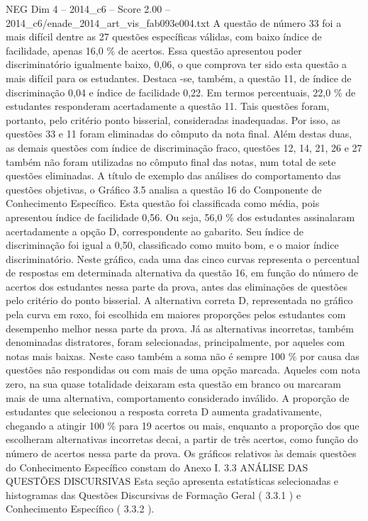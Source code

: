 \begin{textsample}{NEG Dim 4 – 2014\_c6 – Score 2.00 – 2014\_c6/enade\_2014\_art\_vis\_fab093e004.txt}
A questão de número 33 foi a mais difícil dentre as 27 questões específicas válidas, com baixo índice de facilidade, apenas 16,0 \% de acertos.
Essa questão apresentou poder discriminatório igualmente baixo, 0,06, o que comprova ter sido esta questão a mais difícil para os estudantes.
Destaca -se, também, a questão 11, de índice de discriminação 0,04 e índice de facilidade 0,22.
Em termos percentuais, 22,0 \% de estudantes responderam acertadamente a questão 11.
Tais questões foram, portanto, pelo critério ponto bisserial, consideradas inadequadas.
Por isso, as questões 33 e 11 foram eliminadas do cômputo da nota final.
Além destas duas, as demais questões com índice de discriminação fraco, questões 12, 14, 21, 26 e 27 também não foram utilizadas no cômputo final das notas, num total de sete questões eliminadas.
A título de exemplo das análises do comportamento das questões objetivas, o Gráfico 3.5 analisa a questão 16 do Componente de Conhecimento Específico.
Esta questão foi classificada como média, pois apresentou índice de facilidade 0,56.
Ou seja, 56,0 \% dos estudantes assinalaram acertadamente a opção D, correspondente ao gabarito.
Seu índice de discriminação foi igual a 0,50, classificado como muito bom, e o maior índice discriminatório.
Neste gráfico, cada uma das cinco curvas representa o percentual de respostas em determinada alternativa da questão 16, em função do número de acertos dos estudantes nessa parte da prova, antes das eliminações de questões pelo critério do ponto bisserial.
A alternativa correta D, representada no gráfico pela curva em roxo, foi escolhida em maiores proporções pelos estudantes com desempenho melhor nessa parte da prova.
Já as alternativas incorretas, também denominadas distratores, foram selecionadas, principalmente, por aqueles com notas mais baixas.
Neste caso também a soma não é sempre 100 \% por causa das questões não respondidas ou com mais de uma opção marcada.
Aqueles com nota zero, na sua quase totalidade deixaram esta questão em branco ou marcaram mais de uma alternativa, comportamento considerado inválido.
A proporção de estudantes que selecionou a resposta correta D aumenta gradativamente, chegando a atingir 100 \% para 19 acertos ou mais, enquanto a proporção dos que escolheram alternativas incorretas decai, a partir de três acertos, como função do número de acertos nessa parte da prova.
Os gráficos relativos às demais questões do Conhecimento Específico constam do Anexo I. 3.3 ANÁLISE DAS QUESTÕES DISCURSIVAS Esta seção apresenta estatísticas selecionadas e histogramas das Questões Discursivas de Formação Geral ( 3.3.1 ) e Conhecimento Específico ( 3.3.2 ).

\end{textsample}
